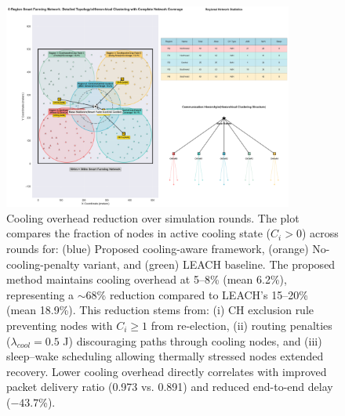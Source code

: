 \begin{figure}[ht]
  \centering
  \includegraphics[width=0.85\textwidth]{figures/figure_02.png}
  \caption{Cooling overhead reduction over simulation rounds. The plot compares the fraction of nodes in active cooling state ($C_i > 0$) across rounds for: (blue) Proposed cooling-aware framework, (orange) No-cooling-penalty variant, and (green) LEACH baseline. The proposed method maintains cooling overhead at 5--8\% (mean 6.2\%), representing a $\sim$68\% reduction compared to LEACH's 15--20\% (mean 18.9\%). This reduction stems from: (i) CH exclusion rule preventing nodes with $C_i \ge 1$ from re-election, (ii) routing penalties ($\lambda_{cool}=0.5$ J) discouraging paths through cooling nodes, and (iii) sleep--wake scheduling allowing thermally stressed nodes extended recovery. Lower cooling overhead directly correlates with improved packet delivery ratio (0.973 vs. 0.891) and reduced end-to-end delay ($-43.7$\%).}
  \label{fig:cooling-overhead}
\end{figure}

